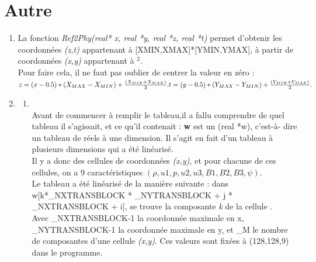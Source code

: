 \documentclass[a4paper,10pt]{article}
\begin{document}
 \section{Autre}
   \begin{enumerate}
     \item
       La fonction \textit{Ref2Phy(real* x, real *y, real *z, real *t)} permet d'obtenir les coordonn\'ees \textit{(z,t)} appartenant \`a [XMIN,XMAX]*[YMIN,YMAX], \`a partir de coordonn\'ees \textit{(x,y)} appartenant \`a \begin{math} [0,1]^2 \end{math}. \\
       Pour faire cela, il ne faut pas oublier de centrer la valeur en z\'ero : \\
       \begin{math}
         z = (x - 0.5) * (X_{MAX} - X_{MIN}) + \frac{(X_{MIN} + X_{MAX})}{2}. \\
         t = (y - 0.5) * (Y_{MAX} - Y_{MIN}) + \frac{(Y_{MIN} + Y_{MAX})}{2}. \\
       \end{math}
     \item
      \begin{enumerate}
        \item
         \\
        Avant de commencer \`a remplir le tableau,il a fallu comprendre de quel tableau il s'agissait, et ce qu'il contenait : \textbf{w} est un (real *w), c'est-\`a- dire un tableau de r\'eels \`a une dimension. Il s'agit en fait d'un tableau \`a plusieurs dimensions qui a \'et\'e lin\'earis\'e. \\
        Il y a donc des cellules de coordonn\'ees \textit{(x,y)}, et pour chacune de ces cellules, on a 9 caract\'eristiques \begin{math}(\rho, u1, p, u2, u3, B1, B2, B3, \psi)\end{math}.\\
        Le tableau a \'et\'e lin\'earis\'e de la mani\`ere suivante : dans w[k*\_NXTRANSBLOCK * \_NYTRANSBLOCK + j * \_NXTRANSBLOCK + i], se trouve la composante \textit{k} de la cellule . \\
        Avec \_NXTRANSBLOCK-1 la coordonn\'ee maximale en x, \_NYTRANSBLOCK-1 la coordonn\'ee maximale en y, et \_M le nombre de composantes d'une cellule \textit{(x,y)}. Ces valeurs sont fix\'ees \`a (128,128,9) dans le programme. \\\\

\end{enumerate}
\end{enumerate}
\end{document}
